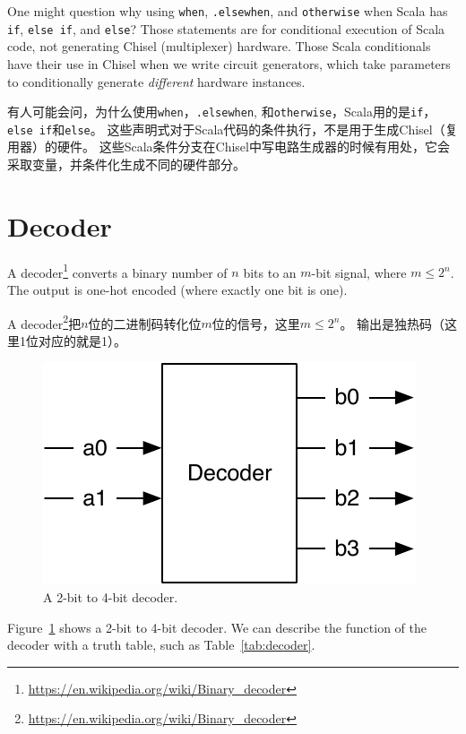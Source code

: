 \documentclass[%
    10pt,
    headinclude, footexclude,
    openright, %
    notitlepage,
    cleardoubleempty,
    headsepline,
    pointlessnumbers,
    bibtotoc, idxtotoc,
    ]{scrbook}
\newcommand{\code}[1]{{\small{\texttt{#1}}}}
\newcommand{\scale}{0.7}
\newcommand{\myref}[2]{\href{#1}{#2}}
\renewcommand{\myref}[2]{{#2}{\footnote{\url{#1}}}}
\begin{document}

One might question why using \code{when}, \code{.elsewhen}, and \code{otherwise}
when Scala has \code{if}, \code{else if}, and \code{else}? Those statements are for
conditional execution of Scala code, not generating Chisel (multiplexer) hardware.
Those Scala conditionals have their use in Chisel when we write circuit generators,
which take parameters to conditionally generate \emph{different} hardware instances.

有人可能会问，为什么使用\code{when}，\code{.elsewhen}, 和\code{otherwise}，Scala用的是\code{if}，\code{else if}和\code{else}。
这些声明式对于Scala代码的条件执行，不是用于生成Chisel（复用器）的硬件。
这些Scala条件分支在Chisel中写电路生成器的时候有用处，它会采取变量，并条件化生成不同的硬件部分。


\section{Decoder}

A \myref{https://en.wikipedia.org/wiki/Binary_decoder}{decoder}
converts a binary number of $n$ bits to an $m$-bit signal, where $m \leq 2^n$.
The output is one-hot encoded (where exactly one bit is one).


A \myref{https://en.wikipedia.org/wiki/Binary_decoder}{decoder}把$n$位的二进制码转化位$m$位的信号，这里$m \leq 2^n$。
输出是独热码（这里1位对应的就是1）。

\begin{figure}
  \centering
  \includegraphics[scale=\scale]{figures/decoder}
  \caption{A 2-bit to 4-bit decoder.}
  \label{fig:decoder}
\end{figure}

Figure~\ref{fig:decoder} shows a 2-bit to 4-bit decoder. We can describe the function
of the decoder with a truth table, such as Table~\ref{tab:decoder}.
\end{document}
